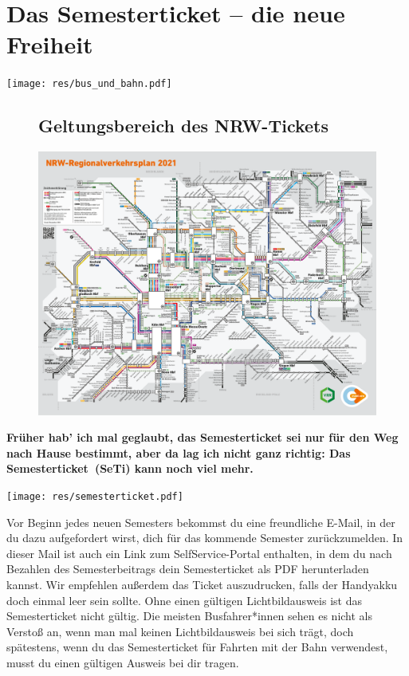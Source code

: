 \section{Das Semesterticket -- die neue Freiheit}

\begin{center}
	\texttt{[image: res/bus\_und\_bahn.pdf]}
\end{center}
\begin{multicols*}{2}
\begin{figure}[t]
	\subsection{Geltungsbereich des NRW-Tickets}
	\includegraphics[width=\textwidth]{res/regionalverkehrsplan_nrw.pdf}
\end{figure}
\textbf{Früher hab' ich mal geglaubt, das Semesterticket sei nur für den Weg nach Hause bestimmt, aber da lag ich nicht ganz richtig: Das Semesterticket~(SeTi) kann noch viel mehr.}

\texttt{[image: res/semesterticket.pdf]}

Vor Beginn jedes neuen Semesters bekommst du eine freundliche E-Mail, in der du dazu aufgefordert wirst, dich für das kommende Semester zurückzumelden. In dieser Mail ist auch ein Link zum SelfService-Portal enthalten, in dem du nach Bezahlen des Semesterbeitrags dein Semesterticket als PDF herunterladen kannst. Wir empfehlen außerdem das Ticket auszudrucken, falls der Handyakku doch einmal leer sein sollte.
Ohne einen gültigen Lichtbildausweis ist das Semesterticket nicht gültig.
Die meisten Busfahrer*innen sehen es nicht als Verstoß an, wenn man mal keinen Lichtbildausweis bei sich trägt, doch spätestens, wenn du das Semesterticket für Fahrten mit der Bahn verwendest, musst du einen gültigen Ausweis bei dir tragen.


\end{multicols*}
